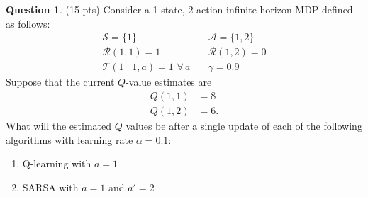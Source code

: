 \documentclass{article}
\theoremstyle{definition}
\newtheorem{question}[thm]{Question}
\begin{document}

\begin{question} (15 pts)
    Consider a 1 state, 2 action infinite horizon MDP defined as follows:
    \begin{align}
        \mathcal{S} = \{1\} \quad & \mathcal{A} = \{1,2\} \\
        \mathcal{R}(1, 1) = 1 \quad & \mathcal{R}(1, 2) = 0\\
        \mathcal{T}(1 \mid 1, a) = 1 \,\, \forall\, a \quad & \gamma = 0.9
    \end{align}
    Suppose that the current $Q$-value estimates are
    \begin{align}
        Q(1, 1) &= 8 \\
        Q(1, 2) &= 6 \text{.}
    \end{align}
    What will the estimated $Q$ values be after a single update of each of the following algorithms with learning rate $\alpha = 0.1$:
    \begin{enumerate}[label=\alph*)]
        \item Q-learning with $a=1$
        \item SARSA with $a=1$ and $a'=2$
    \end{enumerate}
\end{question}
\end{document}
